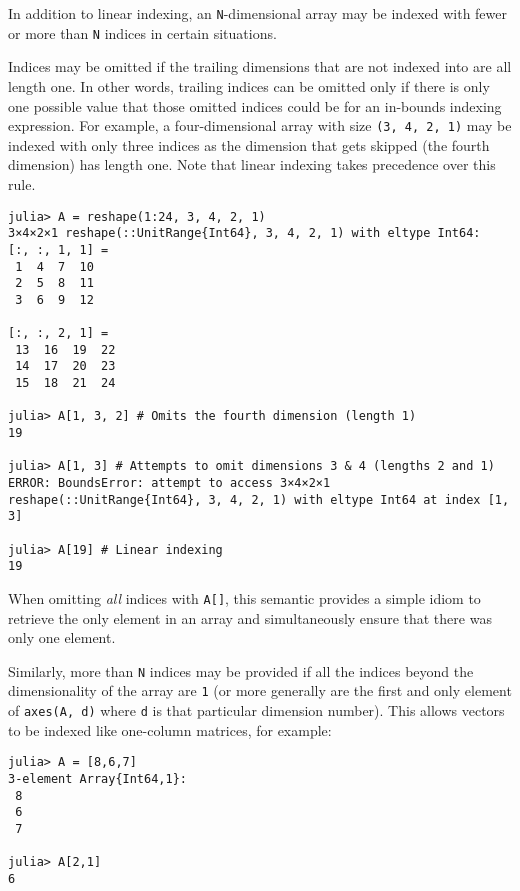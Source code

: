 In addition to linear indexing, an \texttt{N}-dimensional array may be indexed with fewer or more than \texttt{N} indices in certain situations.



Indices may be omitted if the trailing dimensions that are not indexed into are all length one. In other words, trailing indices can be omitted only if there is only one possible value that those omitted indices could be for an in-bounds indexing expression. For example, a four-dimensional array with size \texttt{(3, 4, 2, 1)} may be indexed with only three indices as the dimension that gets skipped (the fourth dimension) has length one. Note that linear indexing takes precedence over this rule.




\begin{verbatim}
julia> A = reshape(1:24, 3, 4, 2, 1)
3×4×2×1 reshape(::UnitRange{Int64}, 3, 4, 2, 1) with eltype Int64:
[:, :, 1, 1] =
 1  4  7  10
 2  5  8  11
 3  6  9  12

[:, :, 2, 1] =
 13  16  19  22
 14  17  20  23
 15  18  21  24

julia> A[1, 3, 2] # Omits the fourth dimension (length 1)
19

julia> A[1, 3] # Attempts to omit dimensions 3 & 4 (lengths 2 and 1)
ERROR: BoundsError: attempt to access 3×4×2×1 reshape(::UnitRange{Int64}, 3, 4, 2, 1) with eltype Int64 at index [1, 3]

julia> A[19] # Linear indexing
19
\end{verbatim}



When omitting \emph{all} indices with \texttt{A[]}, this semantic provides a simple idiom to retrieve the only element in an array and simultaneously ensure that there was only one element.



Similarly, more than \texttt{N} indices may be provided if all the indices beyond the dimensionality of the array are \texttt{1} (or more generally are the first and only element of \texttt{axes(A, d)} where \texttt{d} is that particular dimension number). This allows vectors to be indexed like one-column matrices, for example:




\begin{verbatim}
julia> A = [8,6,7]
3-element Array{Int64,1}:
 8
 6
 7

julia> A[2,1]
6
\end{verbatim}



